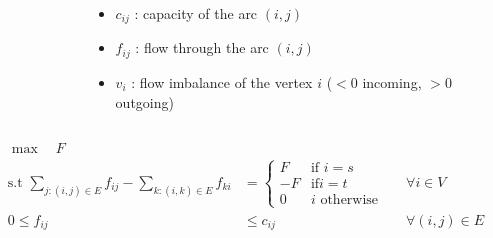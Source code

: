 \begin{frame}[fragile]
\begin{columns}
\begin{column}{0.45\textwidth}
\begin{figure}
	\end{figure}
	\end{column}
	\begin{column}{0.55\textwidth}
  \begin{itemize}
    \item $c_{ij}$ : capacity of the arc $(i,j)$
    \item $f_{ij}$ : flow through the arc $(i,j)$
    \item $v_i$ : flow imbalance of the vertex $i$ ($<0$ incoming, $>0$ outgoing)
    \end{itemize}
	\end{column}
	\end{columns}
	\begin{align*}
    \max\quad F \qquad\qquad\qquad\qquad&\\
    \text{s.t } \sum_{j:(i,j)\in
    E}f_{ij}-\sum_{k:(i,k)\in E}f_{ki}&=
                                        \begin{cases}
                                          F& \text{if } i=s\\
                                          -F& \text{if} i=t\\
                                          0& i \text{ otherwise}
                                        \end{cases}
                                      && \forall i\in V\\
    0\le f_{ij}&\le c_{ij} &&\forall (i,j)\in E
  \end{align*}
	\end{frame}



